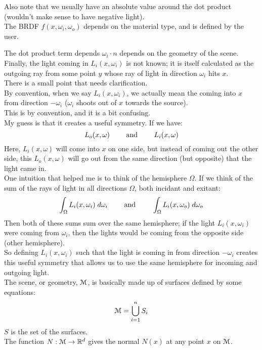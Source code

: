 \documentclass[12pt]{article}
\begin{document}
Also note that we usually have an absolute value
around the dot product (wouldn't make sense to have
negative light). \\

The BRDF $f(x, \omega_i, \omega_o)$ depends on the
material type, and is defined by the user.

The dot product term depends $\omega_i \cdot n$
depends on the geometry of the scene. \\

Finally, the light coming in $L_{i}(x, \omega_i)$
is not known; it is itself calculated
as the outgoing ray from some point $y$
whose ray of light in direction $\omega_i$
hits $x$. \\

There is a small point that needs clarification. \\
By convention, when we say $L_i(x, \omega_i)$,
we actually mean the coming into $x$
from direction $-\omega_i$
($\omega_i$ shoots out of $x$ towards the source). \\
This is by convention, and it is a bit confusing. \\
My guess is that it creates a useful symmetry.
If we have:
\[ L_o(x, \omega) \qquad \text{ and } \qquad L_i(x, \omega) \]
Here, $L_i(x, \omega)$ will come into $x$ on one side,
but instead of coming out the other side,
this $L_o(x, \omega)$ will go out from the same
direction (but opposite) that the light came in. \\
One intuition that helped me is to think of
the hemisphere $\Omega$.
If we think of the sum of the rays of light
in all directions $\Omega$,
both incidant and exitant:
\[ \int_\Omega L_i(x, \omega_i) \; d\omega_i
\qquad \text{ and } \qquad 
\int_\Omega L_i(x, \omega_o) \; d\omega_o \]
Then both of these sums sum over the same
hemisphere; if the light $L_i(x, \omega_i)$
were coming from $\omega_i$,
then the lights would be coming from the
opposite side (other hemisphere). \\
So defining $L_i(x, \omega_i)$
such that the light is coming in from direction
$-\omega_i$ creates this useful
symmetry that allows us to use the same
hemisphere for incoming and outgoing light. \\

The scene, or geometry,
$\mathcal{M}$, is basically made up of surfaces defined
by some equations:
\[ \mathcal{M} = \bigcup_{i=1}^{n} S_i \]
$S$ is the set of the surfaces. \\

The function $N:\mathcal{M} \to \mathbb{R}^d$
gives the normal $N(x)$ at any point $x$ on $\mathcal{M}$. \\
\end{document}
